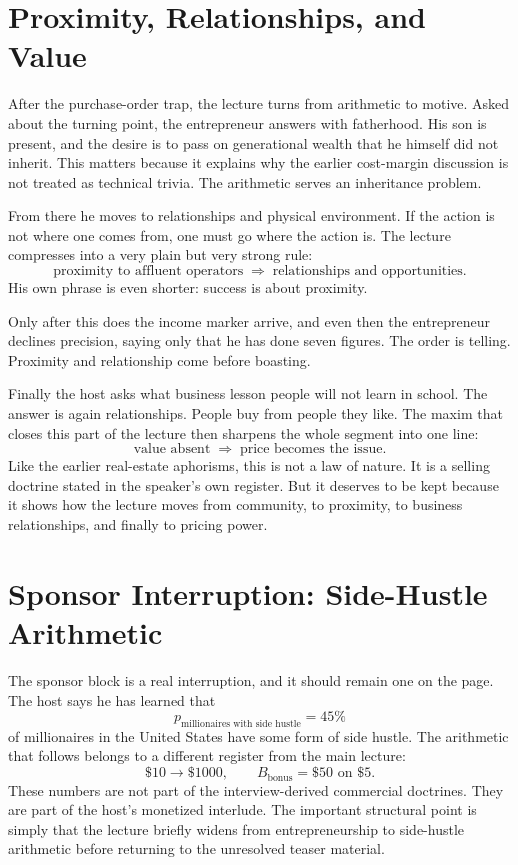 \section{Proximity, Relationships, and Value}

After the purchase-order trap, the lecture turns from arithmetic to motive. Asked about the turning point, the entrepreneur answers with fatherhood. His son is present, and the desire is to pass on generational wealth that he himself did not inherit. This matters because it explains why the earlier cost-margin discussion is not treated as technical trivia. The arithmetic serves an inheritance problem.

From there he moves to relationships and physical environment. If the action is not where one comes from, one must go where the action is. The lecture compresses into a very plain but very strong rule:
\begin{equation}
\text{proximity to affluent operators}
\;\Rightarrow\;
\text{relationships and opportunities}.
\end{equation}
His own phrase is even shorter: success is about proximity.

Only after this does the income marker arrive, and even then the entrepreneur declines precision, saying only that he has done seven figures. The order is telling. Proximity and relationship come before boasting.

Finally the host asks what business lesson people will not learn in school. The answer is again relationships. People buy from people they like. The maxim that closes this part of the lecture then sharpens the whole segment into one line:
\begin{equation}
\text{value absent} \;\Rightarrow\; \text{price becomes the issue}.
\end{equation}
Like the earlier real-estate aphorisms, this is not a law of nature. It is a selling doctrine stated in the speaker's own register. But it deserves to be kept because it shows how the lecture moves from community, to proximity, to business relationships, and finally to pricing power.

\section{Sponsor Interruption: Side-Hustle Arithmetic}

The sponsor block is a real interruption, and it should remain one on the page. The host says he has learned that
\begin{equation}
p_{\text{millionaires with side hustle}} = 45\%
\end{equation}
of millionaires in the United States have some form of side hustle. The arithmetic that follows belongs to a different register from the main lecture:
\begin{equation}
\$10 \to \$1000,\qquad
B_{\text{bonus}} = \$50 \text{ on } \$5.
\end{equation}
These numbers are not part of the interview-derived commercial doctrines. They are part of the host's monetized interlude. The important structural point is simply that the lecture briefly widens from entrepreneurship to side-hustle arithmetic before returning to the unresolved teaser material.

